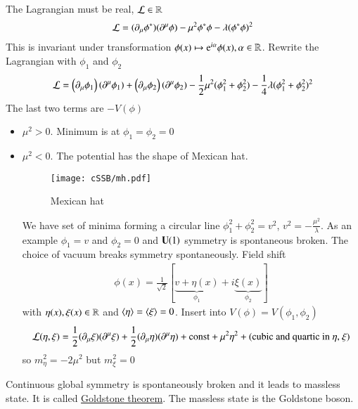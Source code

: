 The Lagrangian must be real, $\mathcal{L} \in \mathbb{R}$
\begin{align}
   \mathcal{L} = ( \partial_\mu \phi^* ) ( \partial^\mu \phi ) - \mu^2 \phi^* \phi - \lambda (\phi^* \phi)^2
\end{align}
This is invariant under transformation $\phi(x) \mapsto \mathrm{e}^{i\alpha} \phi(x), \alpha \in \mathbb{R}$. Rewrite the Lagrangian with $\phi_1$ and $\phi_2$
\begin{align*}
   \mathcal{L} =  \left( \partial_\mu \phi_1 \right) \left( \partial^\mu \phi_1 \right) + \left( \partial_\mu \phi_2 \right) \left( \partial^\mu \phi_2 \right) - \frac{1}{2} \mu^2 (\phi_1^2 + \phi_2^2) - \frac{1}{4} \lambda (\phi_1^2 + \phi_2^2)^2
\end{align*}
The last two terms are $-V(\phi)$

\begin{itemize}
   \item $\mu^2 > 0$. Minimum is at $\phi_1 = \phi_2 = 0$
   \item $\mu^2 < 0$. The potential has the shape of Mexican hat.
   \begin{figure}[htpb]
      \centering
      \texttt{[image: cSSB/mh.pdf]}
      \caption{Mexican hat\cite{wikiSSB}}%
      \label{fig:mexicanHat}
   \end{figure}
      We have set of minima forming a circular line $\phi_1^2 + \phi_2^2 = v^2$, $v^2 = -\frac{\mu^2}{\lambda}$. As an example $\phi_1 = v$ and $\phi_2 = 0$ and $\mathbf{U}(1)$ symmetry is spontaneous broken. The choice of vacuum breaks symmetry spontaneously.
      Field shift
      \begin{align}
         \phi(x) = \frac{1}{\sqrt{2}} \left[ \underbrace{v + \eta(x)}_{\phi_1} + i \underbrace{\xi(x)}_{\phi_2} \right]
      \end{align}
      with $\eta(x), \xi(x) \in \mathbb{R}$ and $\expval{\eta} = \expval{\xi}=0$.
      Insert into $V(\phi) = V(\phi_1, \phi_2)$
      \begin{align}
         \mathcal{L}(\eta, \xi) = \frac{1}{2} (\partial_\mu \xi) (\partial^\mu \xi) + \frac{1}{2} (\partial_\mu \eta) (\partial^\mu \eta) + \text{const} + \mu^2 \eta^2 + (\text{cubic and quartic in $\eta$, $\xi$})
      \end{align}
      so $m_\eta^2 = -2\mu^2$ but $m_\xi^2 = 0$
\end{itemize}
Continuous global symmetry is spontaneously broken and it leads to massless state. It is called \underline{Goldstone theorem}. The massless state is the Goldstone boson.

